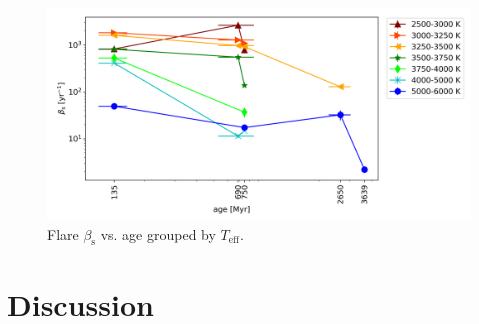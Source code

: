 \documentclass{aa}
\begin{document}
\begin{figure}
    \centering
    \includegraphics[width=13.5cm]{pics/FFDs/beta_T_age_ED.png}
    \caption{Flare $\beta_\mathrm{s}$ vs. age grouped by $T_\mathrm{eff}$.}          	
    \label{powerlawfits_s}
\end{figure}


\section{Discussion}
\end{document}
